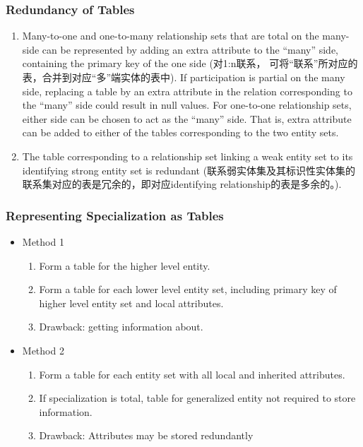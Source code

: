 \subsubsection{Redundancy of Tables}
\begin{enumerate}\small
    \item Many-to-one and one-to-many relationship sets that are total on the many-side can be represented by adding an extra attribute to the “many” side, containing the primary key of the one side (对1:n联系， 可将“联系”所对应的表，合并到对应“多”端实体的表中).
    \subitem If participation is partial on the many side, replacing a table by an extra attribute in the relation corresponding to the “many” side could result in null values. 
    \subitem For one-to-one relationship sets, either side can be chosen to act as the “many” side.  That is, extra attribute can be added to either of the tables corresponding to the two entity sets. 
    \item The table corresponding to a relationship set linking a weak entity set to its identifying strong entity set is redundant (联系弱实体集及其标识性实体集的联系集对应的表是冗余的，即对应identifying relationship的表是多余的。).
\end{enumerate}

\subsubsection{Representing Specialization as Tables}
\begin{itemize}
    \item Method 1
    \begin{enumerate}
        \item Form a table for the higher level entity.
        \item  Form a table for each lower level entity set, including primary key of higher level entity set and local attributes.
        \item Drawback: getting information about. 
    \end{enumerate}
    \item Method 2
    \begin{enumerate}
        \item Form a table for each entity set with all local and inherited attributes. 
        \item If specialization is total, table for generalized entity not required to store information. 
        \item Drawback: Attributes may be stored redundantly       
    \end{enumerate}
\end{itemize}